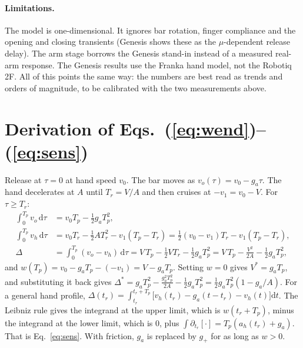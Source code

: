 \documentclass[10.5pt,a4paper]{article}
\newcommand{\gp}{g_{+}}
\begin{document}
\paragraph{Limitations.} The model is one-dimensional. It ignores bar rotation, finger compliance and the
opening and closing transients (Genesis shows these as the $\mu$-dependent release delay). The arm stage borrows
the Genesis stand-in instead of a measured real-arm response. The Genesis results use the Franka hand model, not
the Robotiq 2F. All of this points the same way: the numbers are best read as trends and orders of magnitude,
to be calibrated with the two measurements above.

\appendix
\section{Derivation of Eqs.~(\ref{eq:wend})--(\ref{eq:sens})}
\label{app:derivation}
Release at $\tau=0$ at hand speed $v_0$. The bar moves as $v_o(\tau)=v_0-g_a\tau$. The hand decelerates at $A$
until $T_r=V/A$ and then cruises at $-v_1=v_0-V$. For $\tau\ge T_r$:
\begin{align*}
\int_0^{T_p}v_o\,\mathrm d\tau&=v_0T_p-\tfrac12 g_aT_p^2,\\
\int_0^{T_p}v_h\,\mathrm d\tau&=v_0T_r-\tfrac12 A T_r^2-v_1(T_p-T_r)=\tfrac12(v_0-v_1)T_r-v_1(T_p-T_r),\\
\Delta&=\int_0^{T_p}(v_o-v_h)\,\mathrm d\tau=V\,T_p-\tfrac12 V T_r-\tfrac12 g_aT_p^2
=V\,T_p-\frac{V^2}{2A}-\tfrac12 g_aT_p^2 ,
\end{align*}
and $w(T_p)=v_0-g_aT_p-(-v_1)=V-g_aT_p$. Setting $w=0$ gives $V^*=g_aT_p$, and substituting it back gives
$\Delta^*=g_aT_p^2-\tfrac{g_a^2T_p^2}{2A}-\tfrac12g_aT_p^2=\tfrac12g_aT_p^2(1-g_a/A)$. For a general hand profile,
$\Delta(t_r)=\int_{t_r}^{t_r+T_p}\bigl[v_h(t_r)-g_a(t-t_r)-v_h(t)\bigr]\mathrm dt$. The Leibniz rule gives the
integrand at the upper limit, which is $w(t_r+T_p)$, minus the integrand at the lower limit, which is $0$, plus
$\int\partial_{t_r}[\cdot]=T_p(a_h(t_r)+g_a)$. That is Eq.~\eqref{eq:sens}. With friction, $g_a$ is replaced by
$\gp$ for as long as $w>0$.

\end{document}
